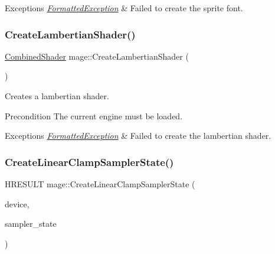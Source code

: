 \begin{DoxyExceptions}{Exceptions}
{\em \hyperlink{structmage_1_1_formatted_exception}{Formatted\+Exception}} & Failed to create the sprite font. \\
\hline
\end{DoxyExceptions}
\hypertarget{namespacemage_ab0bd21012fa29244f0f9b3201bebc2a5}{}\label{namespacemage_ab0bd21012fa29244f0f9b3201bebc2a5} 
\subsubsection{\texorpdfstring{Create\+Lambertian\+Shader()}{CreateLambertianShader()}}
{\footnotesize\ttfamily \hyperlink{structmage_1_1_combined_shader}{Combined\+Shader} mage\+::\+Create\+Lambertian\+Shader (\begin{DoxyParamCaption}{ }\end{DoxyParamCaption})}

Creates a lambertian shader.

\begin{DoxyPrecond}{Precondition}
The current engine must be loaded. 
\end{DoxyPrecond}

\begin{DoxyExceptions}{Exceptions}
{\em \hyperlink{structmage_1_1_formatted_exception}{Formatted\+Exception}} & Failed to create the lambertian shader. \\
\hline
\end{DoxyExceptions}
\hypertarget{namespacemage_aa8f37da8dc3c10b5e4e1cd56be94ff95}{}\label{namespacemage_aa8f37da8dc3c10b5e4e1cd56be94ff95} 
\subsubsection{\texorpdfstring{Create\+Linear\+Clamp\+Sampler\+State()}{CreateLinearClampSamplerState()}}
{\footnotesize\ttfamily H\+R\+E\+S\+U\+LT mage\+::\+Create\+Linear\+Clamp\+Sampler\+State (\begin{DoxyParamCaption}\item[{I\+D3\+D11\+Device2 $\ast$}]{device,  }\item[{I\+D3\+D11\+Sampler\+State $\ast$$\ast$}]{sampler\+\_\+state }\end{DoxyParamCaption})}

